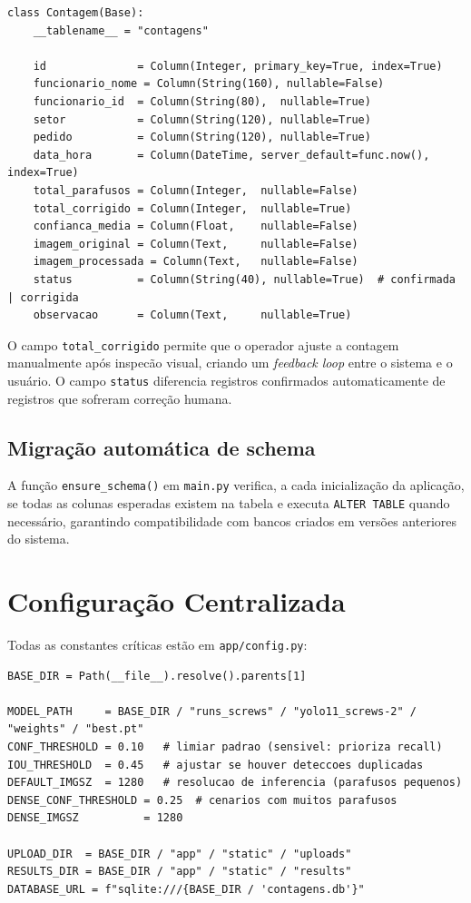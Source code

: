 \documentclass[12pt,a4paper]{article}
\begin{document}
\begin{lstlisting}[caption={Modelo ORM (\texttt{app/models.py})}]
class Contagem(Base):
    __tablename__ = "contagens"

    id              = Column(Integer, primary_key=True, index=True)
    funcionario_nome = Column(String(160), nullable=False)
    funcionario_id  = Column(String(80),  nullable=True)
    setor           = Column(String(120), nullable=True)
    pedido          = Column(String(120), nullable=True)
    data_hora       = Column(DateTime, server_default=func.now(), index=True)
    total_parafusos = Column(Integer,  nullable=False)
    total_corrigido = Column(Integer,  nullable=True)
    confianca_media = Column(Float,    nullable=False)
    imagem_original = Column(Text,     nullable=False)
    imagem_processada = Column(Text,   nullable=False)
    status          = Column(String(40), nullable=True)  # confirmada | corrigida
    observacao      = Column(Text,     nullable=True)
\end{lstlisting}

O campo \texttt{total\_corrigido} permite que o operador ajuste a contagem manualmente
ap\'os inspec\~ao visual, criando um \emph{feedback loop} entre o sistema e o usu\'ario.
O campo \texttt{status} diferencia registros confirmados automaticamente de registros
que sofreram corre\c{c}\~ao humana.

\subsection{Migra\c{c}\~ao autom\'atica de schema}

A fun\c{c}\~ao \texttt{ensure\_schema()} em \texttt{main.py} verifica, a cada
inicializa\c{c}\~ao da aplica\c{c}\~ao, se todas as colunas esperadas existem na tabela
e executa \texttt{ALTER TABLE} quando necess\'ario, garantindo compatibilidade com bancos
criados em vers\~oes anteriores do sistema.

\section{Configura\c{c}\~ao Centralizada}

Todas as constantes cr\'iticas est\~ao em \texttt{app/config.py}:

\begin{lstlisting}[caption={Constantes de configura\c{c}\~ao (\texttt{app/config.py})}]
BASE_DIR = Path(__file__).resolve().parents[1]

MODEL_PATH     = BASE_DIR / "runs_screws" / "yolo11_screws-2" / "weights" / "best.pt"
CONF_THRESHOLD = 0.10   # limiar padrao (sensivel: prioriza recall)
IOU_THRESHOLD  = 0.45   # ajustar se houver deteccoes duplicadas
DEFAULT_IMGSZ  = 1280   # resolucao de inferencia (parafusos pequenos)
DENSE_CONF_THRESHOLD = 0.25  # cenarios com muitos parafusos
DENSE_IMGSZ          = 1280

UPLOAD_DIR  = BASE_DIR / "app" / "static" / "uploads"
RESULTS_DIR = BASE_DIR / "app" / "static" / "results"
DATABASE_URL = f"sqlite:///{BASE_DIR / 'contagens.db'}"
\end{lstlisting}
\end{document}
